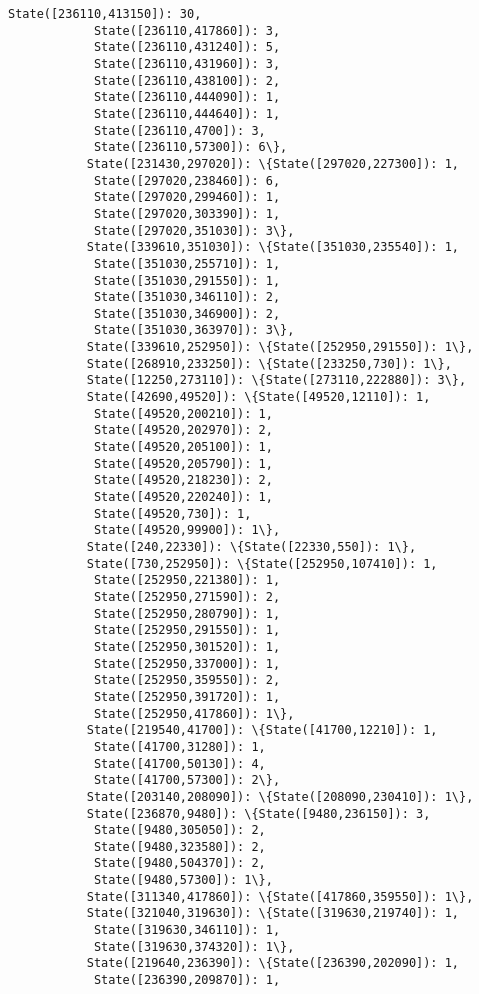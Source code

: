 \documentclass[11pt]{article}
\begin{document}
\begin{Verbatim}[commandchars=\\\{\}]
            State([236110,413150]): 30,
            State([236110,417860]): 3,
            State([236110,431240]): 5,
            State([236110,431960]): 3,
            State([236110,438100]): 2,
            State([236110,444090]): 1,
            State([236110,444640]): 1,
            State([236110,4700]): 3,
            State([236110,57300]): 6\},
           State([231430,297020]): \{State([297020,227300]): 1,
            State([297020,238460]): 6,
            State([297020,299460]): 1,
            State([297020,303390]): 1,
            State([297020,351030]): 3\},
           State([339610,351030]): \{State([351030,235540]): 1,
            State([351030,255710]): 1,
            State([351030,291550]): 1,
            State([351030,346110]): 2,
            State([351030,346900]): 2,
            State([351030,363970]): 3\},
           State([339610,252950]): \{State([252950,291550]): 1\},
           State([268910,233250]): \{State([233250,730]): 1\},
           State([12250,273110]): \{State([273110,222880]): 3\},
           State([42690,49520]): \{State([49520,12110]): 1,
            State([49520,200210]): 1,
            State([49520,202970]): 2,
            State([49520,205100]): 1,
            State([49520,205790]): 1,
            State([49520,218230]): 2,
            State([49520,220240]): 1,
            State([49520,730]): 1,
            State([49520,99900]): 1\},
           State([240,22330]): \{State([22330,550]): 1\},
           State([730,252950]): \{State([252950,107410]): 1,
            State([252950,221380]): 1,
            State([252950,271590]): 2,
            State([252950,280790]): 1,
            State([252950,291550]): 1,
            State([252950,301520]): 1,
            State([252950,337000]): 1,
            State([252950,359550]): 2,
            State([252950,391720]): 1,
            State([252950,417860]): 1\},
           State([219540,41700]): \{State([41700,12210]): 1,
            State([41700,31280]): 1,
            State([41700,50130]): 4,
            State([41700,57300]): 2\},
           State([203140,208090]): \{State([208090,230410]): 1\},
           State([236870,9480]): \{State([9480,236150]): 3,
            State([9480,305050]): 2,
            State([9480,323580]): 2,
            State([9480,504370]): 2,
            State([9480,57300]): 1\},
           State([311340,417860]): \{State([417860,359550]): 1\},
           State([321040,319630]): \{State([319630,219740]): 1,
            State([319630,346110]): 1,
            State([319630,374320]): 1\},
           State([219640,236390]): \{State([236390,202090]): 1,
            State([236390,209870]): 1,

\end{Verbatim}
\end{document}
